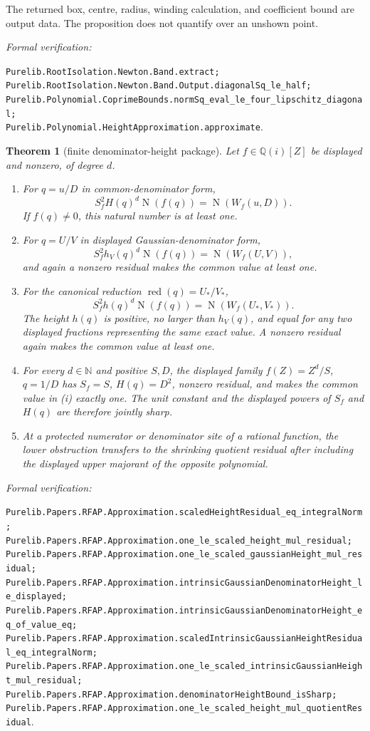 \documentclass[11pt]{article}
\newtheorem{theorem}{Theorem}[section]
\newcommand{\Qi}{\mathbb{Q}(i)}
\newcommand{\N}{\mathbb{N}}
\newcommand{\Norm}[1]{\operatorname{N}\!\left(#1\right)}
\newcommand{\leanref}[1]{\par\smallskip\noindent
  \emph{Formal verification:}\par\nobreak
  {\raggedright\nolinkurl{#1}.\par}}
\begin{document}
The returned box, centre, radius, winding calculation, and coefficient bound
are output data.  The proposition does not quantify over an unshown point.

\leanref{Purelib.RootIsolation.Newton.Band.extract;
Purelib.RootIsolation.Newton.Band.Output.diagonalSq_le_half;
Purelib.Polynomial.CoprimeBounds.normSq_eval_le_four_lipschitz_diagonal;
Purelib.Polynomial.HeightApproximation.approximate}

\begin{theorem}[finite denominator-height package]
\label{thm:height-package}
Let $f\in\Qi[Z]$ be displayed and nonzero, of degree $d$.
\begin{enumerate}[label=(\roman*)]
\item For $q=u/D$ in common-denominator form,
\[
 S_f^2H(q)^d\Norm{f(q)}=\Norm{W_f(u,D)}.
\]
If $f(q)\ne0$, this natural number is at least one.
\item For $q=U/V$ in displayed Gaussian-denominator form,
\[
 S_f^2h_V(q)^d\Norm{f(q)}=\Norm{W_f(U,V)},
\]
and again a nonzero residual makes the common value at least one.
\item For the canonical reduction
$\operatorname{red}(q)=U_*/V_*$,
\[
 S_f^2h(q)^d\Norm{f(q)}=\Norm{W_f(U_*,V_*)}.
\]
The height $h(q)$ is positive, no larger than $h_V(q)$, and equal for any
two displayed fractions representing the same exact value.  A nonzero
residual again makes the common value at least one.
\item For every $d\in\N$ and positive $S,D$, the displayed family
$f(Z)=Z^d/S$, $q=1/D$ has $S_f=S$, $H(q)=D^2$, nonzero residual, and makes
the common value in (i) exactly one.  The unit constant and the displayed
powers of $S_f$ and $H(q)$ are therefore jointly sharp.
\item At a protected numerator or denominator site of a rational function,
the lower obstruction transfers to the shrinking quotient residual after
including the displayed upper majorant of the opposite polynomial.
\end{enumerate}
\end{theorem}

\leanref{Purelib.Papers.RFAP.Approximation.scaledHeightResidual_eq_integralNorm;
Purelib.Papers.RFAP.Approximation.one_le_scaled_height_mul_residual;
Purelib.Papers.RFAP.Approximation.one_le_scaled_gaussianHeight_mul_residual;
Purelib.Papers.RFAP.Approximation.intrinsicGaussianDenominatorHeight_le_displayed;
Purelib.Papers.RFAP.Approximation.intrinsicGaussianDenominatorHeight_eq_of_value_eq;
Purelib.Papers.RFAP.Approximation.scaledIntrinsicGaussianHeightResidual_eq_integralNorm;
Purelib.Papers.RFAP.Approximation.one_le_scaled_intrinsicGaussianHeight_mul_residual;
Purelib.Papers.RFAP.Approximation.denominatorHeightBound_isSharp;
Purelib.Papers.RFAP.Approximation.one_le_scaled_height_mul_quotientResidual}
\end{document}
